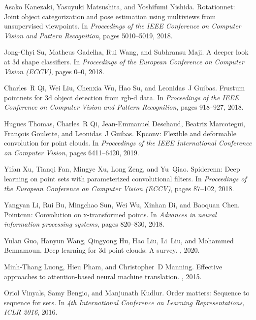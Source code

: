 \documentclass{ieeeaccess}
\begin{document}
\begin{thebibliography}{10}
Asako Kanezaki, Yasuyuki Matsushita, and Yoshifumi Nishida.
\newblock Rotationnet: Joint object categorization and pose estimation using
  multiviews from unsupervised viewpoints.
\newblock In {\em Proceedings of the IEEE Conference on Computer Vision and
  Pattern Recognition}, pages 5010--5019, 2018.

Jong-Chyi Su, Matheus Gadelha, Rui Wang, and Subhransu Maji.
\newblock A deeper look at 3d shape classifiers.
\newblock In {\em Proceedings of the European Conference on Computer Vision
  (ECCV)}, pages 0--0, 2018.

Charles~R Qi, Wei Liu, Chenxia Wu, Hao Su, and Leonidas~J Guibas.
\newblock Frustum pointnets for 3d object detection from rgb-d data.
\newblock In {\em Proceedings of the IEEE Conference on Computer Vision and
  Pattern Recognition}, pages 918--927, 2018.

Hugues Thomas, Charles~R Qi, Jean-Emmanuel Deschaud, Beatriz Marcotegui,
  Fran{\c{c}}ois Goulette, and Leonidas~J Guibas.
\newblock Kpconv: Flexible and deformable convolution for point clouds.
\newblock In {\em Proceedings of the IEEE International Conference on Computer
  Vision}, pages 6411--6420, 2019.

Yifan Xu, Tianqi Fan, Mingye Xu, Long Zeng, and Yu~Qiao.
\newblock Spidercnn: Deep learning on point sets with parameterized
  convolutional filters.
\newblock In {\em Proceedings of the European Conference on Computer Vision
  (ECCV)}, pages 87--102, 2018.

Yangyan Li, Rui Bu, Mingchao Sun, Wei Wu, Xinhan Di, and Baoquan Chen.
\newblock Pointcnn: Convolution on x-transformed points.
\newblock In {\em Advances in neural information processing systems}, pages
  820--830, 2018.

Yulan Guo, Hanyun Wang, Qingyong Hu, Hao Liu, Li~Liu, and Mohammed Bennamoun.
\newblock Deep learning for 3d point clouds: A survey.
,
  2020.

Minh-Thang Luong, Hieu Pham, and Christopher~D Manning.
\newblock Effective approaches to attention-based neural machine translation.
, 2015.

Oriol Vinyals, Samy Bengio, and Manjunath Kudlur.
\newblock Order matters: Sequence to sequence for sets.
\newblock In {\em 4th International Conference on Learning Representations,
  {ICLR} 2016}, 2016.


\end{thebibliography}
\end{document}
